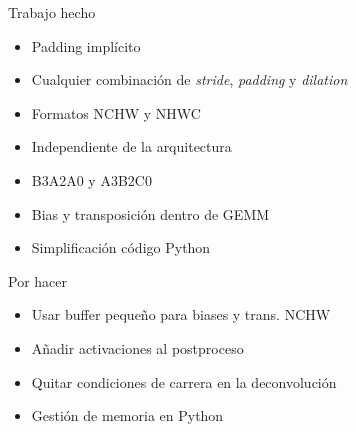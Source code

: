 \documentclass[aspectratio=43]{beamer}
\begin{document}
\begin{frame}
    \begin{block}{Trabajo hecho}
    \begin{itemize}
        \item Padding implícito
        \item Cualquier combinación de \emph{stride}, \emph{padding} y \emph{dilation}
        \item Formatos NCHW y NHWC
        \item Independiente de la arquitectura
        \item B3A2A0 y A3B2C0
        \item Bias y transposición dentro de GEMM
        \item Simplificación código Python
    \end{itemize}
    \end{block}

    \begin{block}{Por hacer}
    \begin{itemize}
        \item Usar buffer pequeño para biases y trans. NCHW
        \item Añadir activaciones al postproceso
        \item Quitar condiciones de carrera en la deconvolución
        \item Gestión de memoria en Python
    \end{itemize}
    \end{block}
\end{frame}
\end{document}
